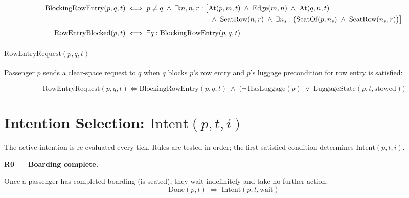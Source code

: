 \documentclass[11pt,a4paper]{article}
\begin{document}
\begin{align}
  \text{BlockingRowEntry}(p,q,t)
    &\iff p \neq q
          \;\wedge\; \exists m,n,r:\bigl[
            \text{At}(p,m,t) \;\wedge\; \text{Edge}(m,n) \;\wedge\; \text{At}(q,n,t)
            \notag\\
    &\phantom{{}\iff p \neq q \;\wedge\; \exists m,n,r:\bigl[{}}
            \;\wedge\; \text{SeatRow}(n,r)
            \;\wedge\; \exists n_s:\bigl(\text{SeatOf}(p,n_s) \;\wedge\; \text{SeatRow}(n_s,r)\bigr)
          \bigr]
    \label{eq:blocking}\\[4pt]
  \text{RowEntryBlocked}(p,t)
    &\iff \exists q:\text{BlockingRowEntry}(p,q,t)
    \label{eq:rowblocked}
\end{align}

\paragraph{$\text{RowEntryRequest}(p,q,t)$}

Passenger $p$ sends a clear-space request to $q$ when $q$ blocks $p$'s row entry and $p$'s
luggage precondition for row entry is satisfied:

\begin{equation}
  \text{RowEntryRequest}(p,q,t)
  \iff \text{BlockingRowEntry}(p,q,t)
       \;\wedge\; \bigl(\neg\,\text{HasLuggage}(p) \;\vee\; \text{LuggageState}(p,t,\text{stowed})\bigr)
  \label{eq:rowentryrequest}
\end{equation}

\section{Intention Selection: $\text{Intent}(p,t,i)$}

The active intention is re-evaluated every tick. Rules are tested in order; the first
satisfied condition determines $\text{Intent}(p,t,i)$.

\medskip
\noindent\textbf{R0 --- Boarding complete.}

Once a passenger has completed boarding (is seated), they wait indefinitely and take no further action:
\begin{equation}
  \text{Done}(p,t)
  \;\Rightarrow\; \text{Intent}(p,t,\text{wait})
  \label{eq:R0}
\end{equation}
\end{document}
